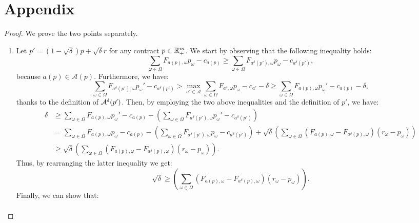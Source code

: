 \section*{Appendix}
\RealtionNonRobust*
\begin{proof}
	We prove the two points separately.
	\begin{enumerate}
		\item Let $p'= (1-\sqrt{\delta})p + \sqrt{\delta} r $ for any contract $p \in \mathbb{R}^{m}_{+}$.
		We start by observing that the following inequality holds:
		\begin{equation*}	
			\sum_{\omega \in \Omega}F_{ a(p),\omega} p_\omega - c_{ a(p)} \ge \sum_{\omega \in \Omega}F_{ a^\delta(p'),\omega} p_\omega - c_{ a^\delta(p')},
		\end{equation*}
		because $a(p) \in \mathcal{A}(p)$. Furthermore, we have:
		\begin{equation*}	
			\sum_{\omega \in \Omega}F_{ a^\delta(p'),\omega} p_\omega' - c_{ a^\delta(p')} > \max_{a' \in \mathcal{A}} \sum_{\omega \in \Omega}F_{ a',\omega} p_\omega - c_{ a'} -\delta \ge \sum_{\omega \in \Omega}F_{ a(p),\omega} p_\omega' - c_{ a(p)} - \delta,
		\end{equation*}
		thanks to the definition of $\mathcal{A}^\delta(p')$.
		Then, by employing the two above inequalities and the definition of $p'$, we have:
		\begin{align*}	
			\delta & \ge \sum_{\omega \in \Omega}F_{ a(p),\omega} p_\omega' - c_{ a(p)} - \left(\sum_{\omega \in \Omega}F_{ a^\delta(p'),\omega} p_\omega' - c_{ a^\delta(p')} \right)\\
			& =  \sum_{\omega \in \Omega}F_{ a(p),\omega} p_\omega - c_{ a(p)} - \left( \sum_{\omega \in \Omega}F_{ a^\delta(p'),\omega} p_\omega - c_{ a^\delta(p')} \right)  + \sqrt \delta \left( \sum_{\omega \in \Omega}\left(F_{ a(p),\omega} - F_{ a^\delta(p),\omega}\right) (r_\omega - p_\omega) \right) \\ 
			& \ge \sqrt \delta \left( \sum_{\omega \in \Omega}\left(F_{ a(p),\omega} - F_{ a^\delta(p),\omega}\right) (r_\omega - p_\omega) \right). 
		\end{align*}
		Thus, by rearranging the latter inequality we get:
		\begin{equation}\label{eq:sqrtdelta}
			\sqrt \delta  \ge \left( \sum_{\omega \in \Omega}\left(F_{ a(p),\omega} - F_{ a^\delta(p),\omega}\right) (r_\omega - p_\omega) \right). 
		\end{equation}
		Finally, we can show that:
		\begin{align*}	

\end{align*}
\end{enumerate}
\end{proof}
